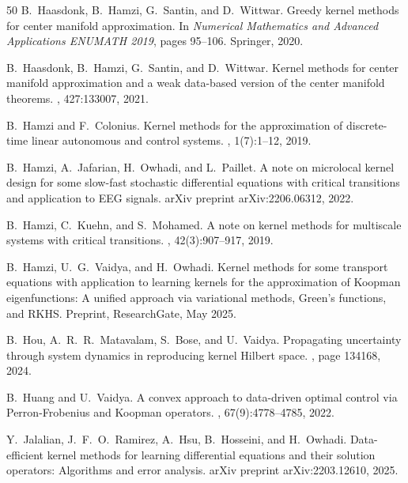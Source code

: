 \documentclass[11pt]{article}
\begin{document}
\begin{thebibliography}{50}
B.~Haasdonk, B.~Hamzi, G.~Santin, and D.~Wittwar.
\newblock Greedy kernel methods for center manifold approximation.
\newblock In {\em Numerical Mathematics and Advanced Applications ENUMATH 2019}, pages 95--106. Springer, 2020.

B.~Haasdonk, B.~Hamzi, G.~Santin, and D.~Wittwar.
\newblock Kernel methods for center manifold approximation and a weak data-based version of the center manifold theorems.
, 427:133007, 2021.

B.~Hamzi and F.~Colonius.
\newblock Kernel methods for the approximation of discrete-time linear autonomous and control systems.
, 1(7):1--12, 2019.

B.~Hamzi, A.~Jafarian, H.~Owhadi, and L.~Paillet.
\newblock A note on microlocal kernel design for some slow-fast stochastic differential equations with critical transitions and application to {EEG} signals.
\newblock arXiv preprint arXiv:2206.06312, 2022.

B.~Hamzi, C.~Kuehn, and S.~Mohamed.
\newblock A note on kernel methods for multiscale systems with critical transitions.
, 42(3):907--917, 2019.

B.~Hamzi, U.~G.~Vaidya, and H.~Owhadi.
\newblock Kernel methods for some transport equations with application to learning kernels for the approximation of {K}oopman eigenfunctions: A unified approach via variational methods, {G}reen's functions, and {RKHS}.
\newblock Preprint, ResearchGate, May 2025.

B.~Hou, A.~R.~R.~Matavalam, S.~Bose, and U.~Vaidya.
\newblock Propagating uncertainty through system dynamics in reproducing kernel {H}ilbert space.
, page 134168, 2024.

B.~Huang and U.~Vaidya.
\newblock A convex approach to data-driven optimal control via {P}erron-{F}robenius and {K}oopman operators.
, 67(9):4778--4785, 2022.

Y.~Jalalian, J.~F.~O.~Ramirez, A.~Hsu, B.~Hosseini, and H.~Owhadi.
\newblock Data-efficient kernel methods for learning differential equations and their solution operators: Algorithms and error analysis.
\newblock arXiv preprint arXiv:2203.12610, 2025.


\end{thebibliography}
\end{document}
